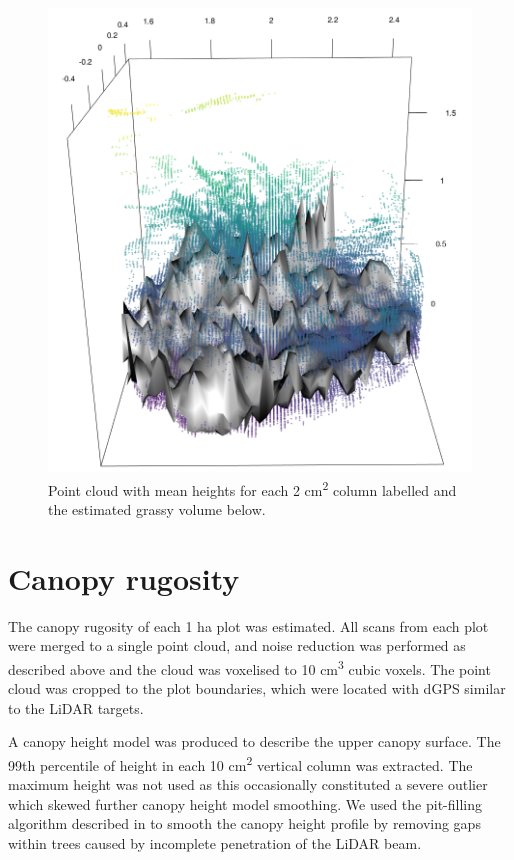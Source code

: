 \documentclass[11pt,a4paper]{article}
\begin{document}
\begin{figure}[H]
\centering
	\includegraphics[width=\textwidth]{grass_3d}
	\caption{Point cloud with mean heights for each 2 cm\textsuperscript{2} column labelled and the estimated grassy volume below.}
	\label{grass_3d}
\end{figure}

\section{Canopy rugosity}

The canopy rugosity of each 1 ha plot was estimated. All scans from each plot were merged to a single point cloud, and noise reduction was performed as described above and the cloud was voxelised to 10 cm\textsuperscript{3} cubic voxels. The point cloud was cropped to the plot boundaries, which were located with dGPS similar to the LiDAR targets. 

A canopy height model was produced to describe the upper canopy surface. The 99th percentile of height in each 10 cm\textsuperscript{2} vertical column was extracted. The maximum height was not used as this occasionally constituted a severe outlier which skewed further 
canopy height model smoothing. We used the pit-filling algorithm described in \citet{Khosravipour2014} to smooth the canopy height profile by removing gaps within trees caused by incomplete penetration of the LiDAR beam.
\end{document}
